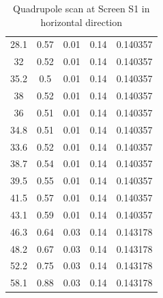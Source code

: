 \documentclass[11pt,a4paper,notitlepage]{scrartcl}
\begin{document}
\begin{table}[htbp]
\begin{tabular}{c|c|c|c|c}
		28.1      & 0.57               & 0.01            & 0.14           & 0.140357       \\
		32        & 0.52               & 0.01            & 0.14           & 0.140357       \\
		35.2      & 0.5                & 0.01            & 0.14           & 0.140357       \\
		38        & 0.52               & 0.01            & 0.14           & 0.140357       \\
		36        & 0.51               & 0.01            & 0.14           & 0.140357       \\
		34.8      & 0.51               & 0.01            & 0.14           & 0.140357       \\
		33.6      & 0.52               & 0.01            & 0.14           & 0.140357       \\
		38.7      & 0.54               & 0.01            & 0.14           & 0.140357       \\
		39.5      & 0.55               & 0.01            & 0.14           & 0.140357       \\
		41.5      & 0.57               & 0.01            & 0.14           & 0.140357       \\
		43.1      & 0.59               & 0.01            & 0.14           & 0.140357       \\
		46.3      & 0.64               & 0.03            & 0.14           & 0.143178       \\
		48.2      & 0.67               & 0.03            & 0.14           & 0.143178       \\
		52.2      & 0.75               & 0.03            & 0.14           & 0.143178       \\
		58.1      & 0.88               & 0.03            & 0.14           & 0.143178      
	\end{tabular}
\caption{Quadrupole scan at Screen S1 in horizontal direction}
\label{tab:qscan1x}
\end{table}
\end{document}
